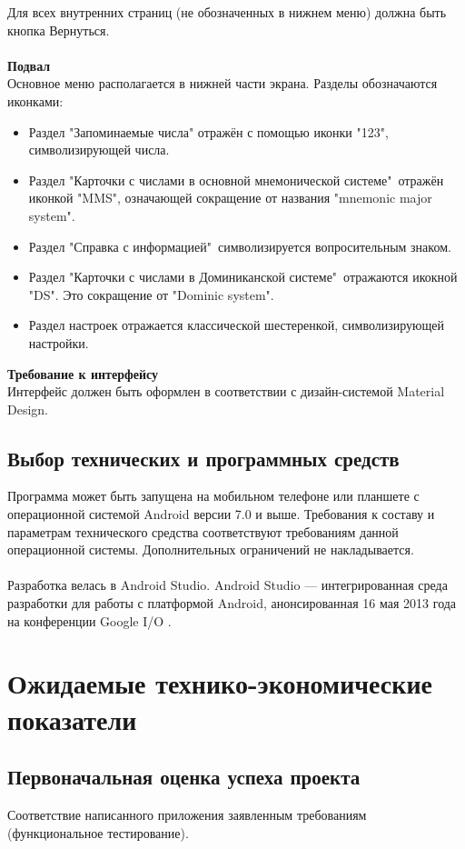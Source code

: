 \documentclass[draft]{article}
\begin{document}
Для всех внутренних страниц (не обозначенных в нижнем меню) должна быть кнопка
Вернуться.\\
~\\
\textbf{Подвал}\\
Основное меню располагается в нижней части экрана. Разделы обозначаются иконками:
\begin{itemize}
\item Раздел "{}Запоминаемые числа"{} отражён с помощью иконки "{}123"{}, символизирующей числа.
\item Раздел "{}Карточки с числами в основной мнемонической системе"{}\ отражён иконкой "{}MMS"{}, означающей сокращение от названия "{}mnemonic major system"{}.
\item Раздел "{}Справка с информацией"{}\ символизируется вопросительным знаком.
\item Раздел "{}Карточки с числами в Доминиканской системе"{}\ отражаются икокной "{}DS"{}. Это сокращение от "{}Dominic system"{}.
\item Раздел настроек отражается классической шестеренкой, символизирующей настройки.
\end{itemize}
\textbf{Требование к интерфейсу}\\
Интерфейс должен быть оформлен в соответствии с дизайн-системой Material Design.
\subsection{Выбор технических и программных средств}
Программа может быть запущена на мобильном телефоне или планшете с операционной системой Android версии 7.0 и выше. Требования к составу и параметрам технического средства соответствуют требованиям данной операционной системы. Дополнительных ограничений не накладывается.\\
~\\
Разработка велась в Android Studio. Android Studio — интегрированная среда разработки для работы с платформой Android, анонсированная 16 мая 2013 года на конференции Google I/O \cite{litlink4}.
\newpage
\section{Ожидаемые технико-экономические показатели}
\subsection{Первоначальная оценка успеха проекта}
Соответствие написанного приложения заявленным требованиям (функциональное тестирование).
\end{document}
